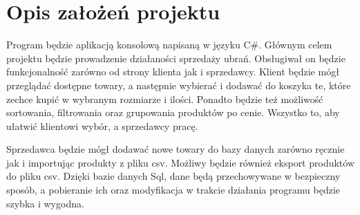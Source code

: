 ﻿\chapter*{Opis założeń projektu}

Program będzie aplikacją konsolową napisaną w języku C\#. Głównym celem projektu będzie prowadzenie działaności sprzedaży ubrań. Obsługiwał on będzie funkcjonalność zarówno od strony klienta jak i sprzedawcy. Klient będzie mógł przeglądać dostępne towary, a następnie wybierać i dodawać do koszyka te, które zechce kupić w wybranym rozmiarze i ilości. Ponadto będzie też możliwość sortowania, filtrowania oraz grupowania produktów po cenie. Wszystko to, aby ułatwić klientowi wybór, a sprzedawcy pracę.\newline

Sprzedawca będzie mógł dodawać nowe towary do bazy danych zarówno ręcznie jak i importując produkty z pliku csv. Możliwy będzie również eksport produktów do pliku csv. Dzięki bazie danych Sql, dane będą przechowywane w bezpieczny sposób, a pobieranie ich oraz modyfikacja w trakcie działania programu będzie szybka i wygodna.

